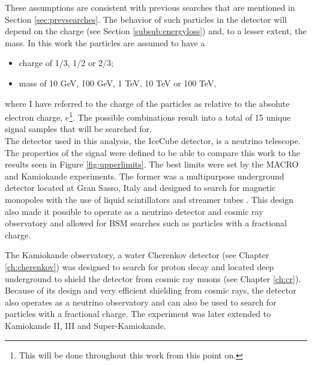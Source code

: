 \noindent These assumptions are consistent with previous searches that are mentioned in Section \ref{sec:prevsearches}. The behavior of such particles in the detector will depend on the charge (see Section \ref{subsub:energyloss}) and, to a lesser extent, the mass. In this work the particles are assumed to have a
\vspace{2mm}

\begin{itemize}
\item charge of 1/3, 1/2 or 2/3;
\item mass of 10 GeV, 100 GeV, 1 TeV, 10 TeV or 100 TeV,
\end{itemize}
\vspace{2mm}

\noindent where I have referred to the charge of the particles as relative to the absolute electron charge, $e$\footnote{This will be done throughout this work from this point on.}. The possible combinations result into a total of 15 unique signal samples that will be searched for.\\

\noindent The detector used in this analysis, the IceCube detector, is a neutrino telescope. The properties of the signal were defined to be able to compare this work to the results seen in Figure \ref{fig:upperlimits}. The best limits were set by the MACRO and Kamiokande experiments. The former was a multipurpose underground detector located at Gran Sasso, Italy and designed to search for magnetic monopoles with the use of liquid scintillators and streamer tubes \cite{Giacomelli:2007sk}. This design also made it possible to operate as a neutrino detector and cosmic ray observatory and allowed for BSM searches such as particles with a fractional charge.

The Kamiokande observatory, a water Cherenkov detector (see Chapter \ref{ch:cherenkov}) was designed to search for proton decay and located deep underground to shield the detector from cosmic ray muons (see Chapter \ref{ch:cr}). Because of its design and very efficient shielding from cosmic rays, the detector also operates as a neutrino observatory and can also be used to search for particles with a fractional charge. The experiment was later extended to Kamiokande II, III and Super-Kamiokande.  